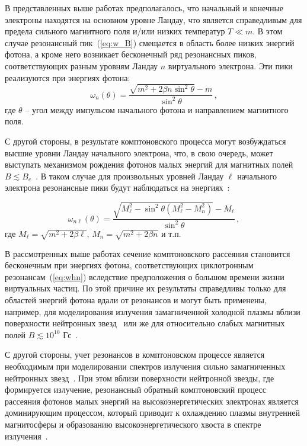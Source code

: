 \documentclass[cp1251%
               ]{jetp} %
\begin{document}
В представленных выше работах предполагалось, что начальный и конечные электроны находятся 
на основном уровне Ландау, что является справедливым для предела сильного магнитного поля 
и/или низких температур $T\ll m$. В этом случае резонансный 
пик~(\ref{eq:w_B})  смещается в область более низких энергий фотона, а кроме 
него возникает бесконечный ряд резонансных пиков, соответствующих разным 
уровням Ландау $n$ 
виртуального электрона. Эти пики реализуются при энергиях фотона:
\begin{equation}\label{eq:whn}
	\omega_n(\theta)= \frac{\sqrt{m^2+2 \beta n \sin^2\theta} - 
		m}{\sin^2\theta}\, ,
\end{equation}
где $\theta$ -- угол между импульсом начального фотона и направлением 
магнитного поля. 

С другой стороны, в результате комптоновского процесса могут возбуждаться 
высшие уровни Ландау начального электрона, что, в свою очередь, может выступать 
механизмом рождения фотонов малых энергий для магнитных полей $B\lesssim 
B_e$~\cite{Daugherty:1986,Bussard:1986}. В таком случае для произвольных уровней Ландау $\ell$ начального электрона резонансные 
пики будут наблюдаться на энергиях~\cite{Daugherty:1986}:

\begin{equation}\label{eq:resAll}
	\omega_{n\ell}(\theta)=\frac{\sqrt{M_\ell^2 - \sin^2\theta (M_\ell^2-M_n^2)}-M_\ell}{\sin^2\theta}\, ,
\end{equation}
где $M_\ell=\sqrt{m^2+2\beta \ell}$, $M_n=\sqrt{m^2+2\beta n}$ и т.п.

В рассмотренных выше работах сечение комптоновского рассеяния 
становится бесконечным при энергиях фотона, соответствующих циклотронным 
резонансам~(\ref{eq:whn}) вследствие предположения о 
большом времени жизни виртуальных частиц. По этой причине их результаты 
справедливы только для областей энергий фотона вдали от резонансов
и могут быть применены, например, для моделирования излучения 
замагниченной 
	холодной плазмы вблизи поверхности нейтронных 
	звезд~\cite{Ozel:2001} или же для относительно слабых магнитных 
	полей $B\lesssim 10^{10}$ Гс~\cite{Zavlin:1996}.

С другой стороны, учет резонансов в комптоновском процессе является необходимым 
при моделировании спектров излучения сильно замагниченных нейтронных 
звезд~\cite{Alexander:1991,Araya:1999,Ho:2001,Lyutikov:2006,Potekhin:2004,Schonherr:2007,Nishimura:2008,Suleimanov:2009}.
При этом вблизи поверхности нейтронной звезды, где формируется излучение, резонансный 
обратный комптоновский процесс рассеяния фотонов малых энергий на высокоэнергетических электронах 
является доминирующим процессом, который приводит к охлаждению плазмы 
внутренней магнитосферы и образованию высокоэнергетического хвоста в спектре 
излучения~\cite{Fernandez:2007,Nobili:2008,Baring:2018,Beloborodov:2013}.
\end{document}
